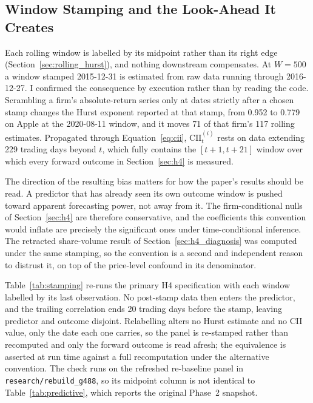 \documentclass[preprint,12pt,authoryear]{elsarticle}
\begin{document}
\subsection{Window Stamping and the Look-Ahead It Creates}
\label{sec:stamping}

Each rolling window is labelled by its midpoint rather than its right edge (Section~\ref{sec:rolling_hurst}), and nothing downstream compensates. At $W = 500$ a window stamped 2015-12-31 is estimated from raw data running through 2016-12-27. I confirmed the consequence by execution rather than by reading the code. Scrambling a firm's absolute-return series only at dates strictly after a chosen stamp changes the Hurst exponent reported at that stamp, from 0.952 to 0.779 on Apple at the 2020-08-11 window, and it moves 71 of that firm's 117 rolling estimates. Propagated through Equation~\eqref{eq:cii}, $\mathrm{CII}^{(i)}_t$ rests on data extending 229 trading days beyond $t$, which fully contains the $[t+1, t+21]$ window over which every forward outcome in Section~\ref{sec:h4} is measured.

The direction of the resulting bias matters for how the paper's results should be read. A predictor that has already seen its own outcome window is pushed toward apparent forecasting power, not away from it. The firm-conditional nulls of Section~\ref{sec:h4} are therefore conservative, and the coefficients this convention would inflate are precisely the significant ones under time-conditional inference. The retracted share-volume result of Section~\ref{sec:h4_diagnosis} was computed under the same stamping, so the convention is a second and independent reason to distrust it, on top of the price-level confound in its denominator.

Table~\ref{tab:stamping} re-runs the primary H4 specification with each window labelled by its last observation. No post-stamp data then enters the predictor, and the trailing correlation ends 20 trading days before the stamp, leaving predictor and outcome disjoint. Relabelling alters no Hurst estimate and no CII value, only the date each one carries, so the panel is re-stamped rather than recomputed and only the forward outcome is read afresh; the equivalence is asserted at run time against a full recomputation under the alternative convention. The check runs on the refreshed re-baseline panel in \texttt{research/rebuild\_g488}, so its midpoint column is not identical to Table~\ref{tab:predictive}, which reports the original Phase~2 snapshot.
\end{document}

